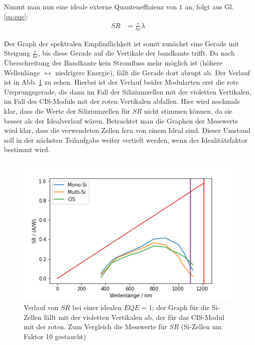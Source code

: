 Nimmt man nun eine ideale externe Quanteneffizienz von $1$ an, folgt aus Gl. \ref{eq:eqe}:
\begin{align}
SR &= \frac{e}{hc}\lambda
\end{align}

Der Graph der spektralen Empfindlichkeit ist somit zunächst eine Gerade mit Steigung $\frac{e}{hc}$, bis diese Gerade auf die
Vertikale der bandkante trifft. Da nach Überschreitung der Bandkante kein Stromfluss mehr möglich ist (höhere Wellenlänge 
$\leftrightarrow$ niedrigere Energie), fällt die Gerade dort abrupt ab. Der Verlauf ist in Abb. \ref{bild:idealEQE} zu sehen.
Hierbei ist der Verlauf beider Modularten erst die rote Ursprungsgerade, die dann im Fall der Siliziumzellen mit der violetten
Vertikalen, im Fall des CIS-Moduls mit der roten Vertikalen abfallen.
Hier wird 
nochmals klar, dass die Werte der Siliziumzellen für $SR$ nicht stimmen können, da sie besser als der Idealverlauf wären.
Betrachtet man die Graphen der Messwerte wird klar, dass die verwendeten Zellen fern von einem Ideal sind. Dieser Umstand soll in der
nächsten Teilaufgabe weiter vertieft werden, wenn der Idealitätsfaktor bestimmt wird.

\begin{figure}[ht]
    \centering
    \includegraphics[scale=0.75]{Bilder/32idealEQE.png}
    \caption{Verlauf von $SR$ bei einer idealen $EQE = 1$; der Graph für die Si-Zellen fällt mit der violetten Vertikalen ab, der für
    das CIS-Modul mit der roten. Zum Vergleich die Messwerte für $SR$ (Si-Zellen um Faktor 10 gestaucht)}
    \label{bild:idealEQE}
\end{figure}

